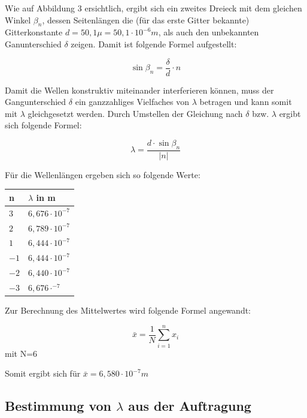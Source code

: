 \documentclass[12pt,a4paper,titlepage,headinclude,bibtotoc]{scrartcl}
\begin{document}
Wie auf Abbildung 3 ersichtlich, ergibt sich ein zweites Dreieck mit dem gleichen Winkel $\beta_n$, dessen Seitenlängen die (für das erste Gitter bekannte) Gitterkonstante $d= 50,1\mu=50,1\cdot10^{-6}m$, als auch den unbekannten Ganunterschied $\delta$ zeigen. Damit ist folgende Formel aufgestellt:

\begin{equation}
\sin{\beta_n}=\frac{\delta}{d}\cdot n
\end{equation}

Damit die Wellen konstruktiv miteinander interferieren können, muss der Gangunterschied $\delta$ ein ganzzahliges Vielfaches von $\lambda$ betragen und kann somit mit $\lambda$ gleichgesetzt werden. Durch Umstellen der Gleichung nach $\delta$ bzw. $\lambda$ ergibt sich folgende Formel:

\begin{equation}
\lambda = \frac{d\cdot \sin\beta_n}{|n|}
\end{equation}

Für die Wellenlängen ergeben sich so folgende Werte:

\begin{table} [h]
\centering
\begin{tabular}{|p{4 cm}||p{4 cm}|}
        \hline
		n& $\lambda$ in m\\
         \hline 
         $3$ & $6,676\cdot10^{-7}$  \\
         \hline
         $2$ & $6,789\cdot10^{-7}$\\
         \hline
         $1$ & $6,444\cdot10^{-7}$ \\
         \hline
         $-1$ & $6,444\cdot10^{-7}$ \\
         \hline
         $-2$ & $6,440\cdot10^{-7}$ \\
         \hline             
         $-3$ & $6,676\cdot^{-7}$ \\
         \hline
\end{tabular}
\end{table}

Zur Berechnung des Mittelwertes wird folgende Formel angewandt:

\[\bar{x} =\frac{1}{N}\sum_{i=1}^n x_i\] mit N=6

Somit ergibt sich für $\bar{x} = 6,580\cdot10^{-7} m $

\subsection{Bestimmung von $\lambda$ aus der Auftragung}
\end{document}
